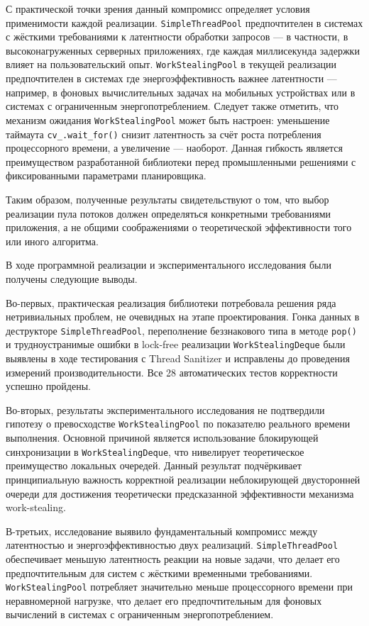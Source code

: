 С практической точки зрения данный компромисс определяет
условия применимости каждой реализации. \texttt{SimpleThreadPool}
предпочтителен в системах с жёсткими требованиями к латентности
обработки запросов --- в частности, в высоконагруженных
серверных приложениях, где каждая миллисекунда задержки влияет
на пользовательский опыт. \texttt{WorkStealingPool} в текущей
реализации предпочтителен в системах где энергоэффективность
важнее латентности --- например, в фоновых вычислительных
задачах на мобильных устройствах или в системах с ограниченным
энергопотреблением. Следует также отметить, что механизм ожидания
\texttt{WorkStealingPool} может быть настроен: уменьшение
таймаута \texttt{cv\_.wait\_for()} снизит латентность за счёт
роста потребления процессорного времени, а увеличение ---
наоборот. Данная гибкость является преимуществом разработанной
библиотеки перед промышленными решениями с фиксированными
параметрами планировщика.

Таким образом, полученные результаты свидетельствуют о том,
что выбор реализации пула потоков должен определяться
конкретными требованиями приложения, а не общими соображениями
о теоретической эффективности того или иного алгоритма.

В ходе программной реализации и экспериментального исследования
были получены следующие выводы.

Во-первых, практическая реализация библиотеки потребовала
решения ряда нетривиальных проблем, не очевидных на этапе
проектирования. Гонка данных в деструкторе
\texttt{SimpleThreadPool}, переполнение беззнакового типа
в методе \texttt{pop()} и трудноустранимые ошибки в lock-free
реализации \texttt{WorkStealingDeque} были выявлены в ходе
тестирования с Thread Sanitizer и исправлены до проведения
измерений производительности. Все 28 автоматических тестов
корректности успешно пройдены.

Во-вторых, результаты экспериментального исследования не
подтвердили гипотезу о превосходстве \texttt{WorkStealingPool}
по показателю реального времени выполнения. Основной причиной
является использование блокирующей синхронизации в
\texttt{WorkStealingDeque}, что нивелирует теоретическое
преимущество локальных очередей. Данный результат подчёркивает
принципиальную важность корректной реализации неблокирующей
двусторонней очереди для достижения теоретически предсказанной
эффективности механизма work-stealing.

В-третьих, исследование выявило фундаментальный компромисс
между латентностью и энергоэффективностью двух реализаций.
\texttt{SimpleThreadPool} обеспечивает меньшую латентность
реакции на новые задачи, что делает его предпочтительным
для систем с жёсткими временными требованиями.
\texttt{WorkStealingPool} потребляет значительно меньше
процессорного времени при неравномерной нагрузке, что делает
его предпочтительным для фоновых вычислений в системах
с ограниченным энергопотреблением.